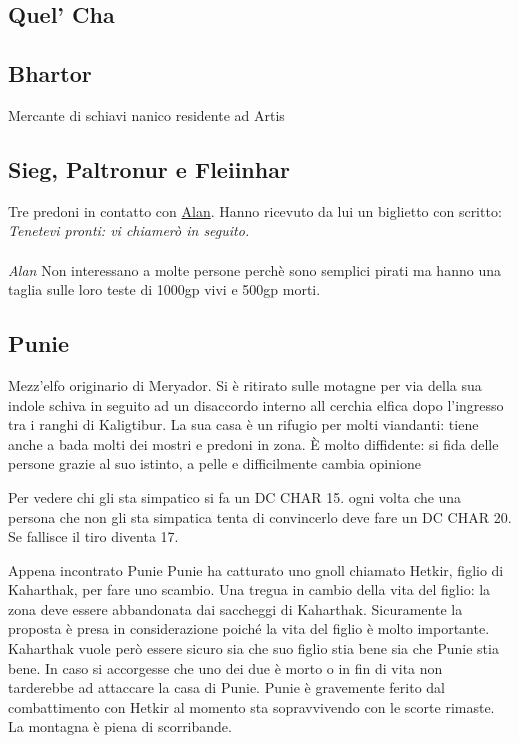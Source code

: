 \documentclass[10pt,twoside,twocolumn]{article}
\begin{document}
\subsection{Quel' Cha}
\label{char:quelcha}
\subsection{Bhartor}\label{char:bhartor}
Mercante di schiavi nanico residente ad Artis
\subsection{Sieg, Paltronur e Fleiinhar}\label{char:sieg}
Tre predoni in contatto con \hyperref[char:alan]{Alan}. Hanno ricevuto da lui un biglietto con scritto: \\
\textit{
  Tenetevi pronti: vi chiamer\`o in seguito. \\ \\Alan}
Non interessano a molte persone perch\`e sono semplici pirati ma hanno una taglia
sulle loro teste di 1000gp vivi e 500gp morti.
\subsection{Punie}\label{char:punie}
Mezz'elfo originario di Meryador. Si \`e ritirato sulle motagne per via della sua indole
schiva in seguito ad un disaccordo interno all cerchia elfica dopo l'ingresso tra
i ranghi di Kaligtibur.
La sua casa \`e un rifugio per molti viandanti: tiene anche a bada molti dei mostri e
predoni in zona.
\`E molto diffidente: si fida delle persone grazie al suo istinto, a pelle e difficilmente
cambia opinione
\begin{quotebox}
  Per vedere chi gli sta simpatico si fa un DC CHAR 15. ogni volta che una persona che non gli sta
  simpatica tenta di convincerlo deve fare un DC CHAR 20. Se fallisce il tiro diventa 17.
\end{quotebox}
\begin{commentbox}{Appena incontrato Punie}
Punie ha catturato uno gnoll chiamato Hetkir, figlio di Kaharthak, per fare uno scambio.
Una tregua in cambio della vita del figlio: la zona deve essere abbandonata dai saccheggi di
Kaharthak. Sicuramente la proposta \`e presa in considerazione poich\'e la vita
del figlio \`e molto importante. Kaharthak vuole per\`o essere sicuro sia che suo figlio stia
bene sia che Punie stia bene. In caso si accorgesse che uno dei due \`e morto o in fin di vita
non tarderebbe ad attaccare la casa di Punie. Punie \`e gravemente ferito dal combattimento
con Hetkir al momento sta sopravvivendo con le scorte rimaste. La montagna \`e piena di scorribande.
\end{commentbox}
\end{document}
